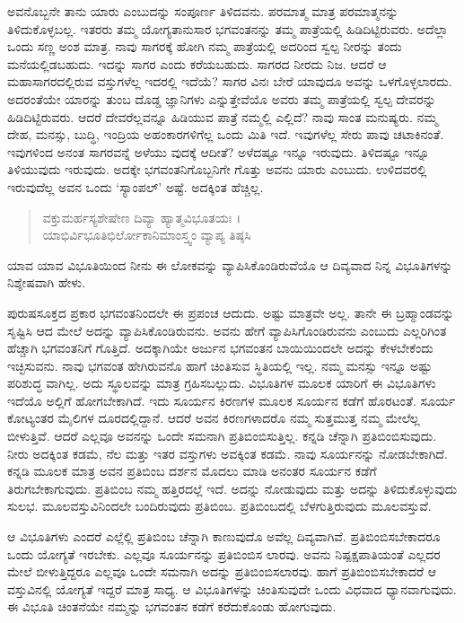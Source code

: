 ಅವನೊಬ್ಬನೇ ತಾನು ಯಾರು ಎಂಬುದನ್ನು ಸಂಪೂರ್ಣ ತಿಳಿದವನು. ಪರಮಾತ್ಮ ಮಾತ್ರ ಪರಮಾತ್ಮನನ್ನು ತಿಳಿದುಕೊಳ್ಳಬಲ್ಲ. ಇತರರು ತಮ್ಮ ಯೋಗ್ಯತಾನುಸಾರ ಭಗವಂತನನ್ನು ತಮ್ಮ ಪಾತ್ರೆಯಲ್ಲಿ ಹಿಡಿದಿಟ್ಟಿರುವರು. ಅದೆಲ್ಲಾ ಒಂದು ಸಣ್ಣ ಅಂಶ ಮಾತ್ರ. ನಾವು ಸಾಗರಕ್ಕೆ ಹೋಗಿ ನಮ್ಮ ಪಾತ್ರೆಯಲ್ಲಿ ಅದರಿಂದ ಸ್ವಲ್ಪ ನೀರನ್ನು ತಂದು ಮನೆಯಲ್ಲಿಡಬಹುದು. ಇದನ್ನು ಸಾಗರ ಎಂದು ಕರೆಯಬಹುದು. ಸಾಗರದ ನೀರದು ನಿಜ. ಆದರೆ ಆ ಮಹಾಸಾಗರದಲ್ಲಿರುವ ವಸ್ತುಗಳೆಲ್ಲ ಇದರಲ್ಲಿ ಇದೆಯೆ? ಸಾಗರ ವಿನಃ ಬೇರೆ ಯಾವುದೂ ಅವನ್ನು ಒಳಗೊಳ್ಳಲಾರದು. ಅದರಂತೆಯೇ ಯಾರನ್ನು ತುಂಬ ದೊಡ್ಡ ಜ್ಞಾನಿಗಳು ಎನ್ನುತ್ತೇವೆಯೊ ಅವರು ತಮ್ಮ ಪಾತ್ರೆಯಲ್ಲಿ ಸ್ವಲ್ಪ ದೇವರನ್ನು ಹಿಡಿದಿಟ್ಟಿರುವರು. ಆದರೆ ದೇವರೆಲ್ಲವನ್ನೂ ಹಿಡಿಯುವ ಪಾತ್ರೆ ನಮ್ಮಲ್ಲಿ ಎಲ್ಲಿದೆ? ನಾವು ಸಾಂತ ಮನುಷ್ಯರು. ನಮ್ಮ ದೇಹ, ಮನಸ್ಸು, ಬುದ್ಧಿ, ಇಂದ್ರಿಯ ಅಹಂಕಾರಗಳಿಗೆಲ್ಲ ಒಂದು ಮಿತಿ ಇದೆ. ಇವುಗಳೆಲ್ಲ ಸೇರು ಪಾವು ಚಟಾಕಿನಂತೆ. ಇವುಗಳಿಂದ ಅನಂತ ಸಾಗರವನ್ನೆ ಅಳೆಯು ವುದಕ್ಕೆ ಆದೀತೆ? ಅಳೆದಷ್ಟೂ ಇನ್ನೂ ಇರುವುದು. ತಿಳಿದಷ್ಟೂ ಇನ್ನೂ ತಿಳಿಯುವುದು ಇರುವುದು. ಅದಕ್ಕೇ ಭಗವಂತನಿಗೊಬ್ಬನಿಗೇ ಗೊತ್ತು ಅವನು ಯಾರು ಎಂಬುದು. ಉಳಿದವರಲ್ಲಿ ಇರುವುದೆಲ್ಲ ಅವನ ಒಂದು ‘ಸ್ಯಾಂಪಲ್​’ ಅಷ್ಟೆ. ಅದಕ್ಕಿಂತ ಹೆಚ್ಚಿಲ್ಲ.

\begin{verse}
ವಕ್ತುಮರ್ಹಸ್ಯಶೇಷೇಣ ದಿವ್ಯಾ ಹ್ಯಾತ್ಮವಿಭೂತಯಃ ।\\ಯಾಭಿರ್ವಿಭೂತಿಭಿರ್ಲೋಕಾನಿಮಾಂಸ್ತ್ವಂ ವ್ಯಾಪ್ಯ ತಿಷ್ಠಸಿ 
\end{verse}

{\small ಯಾವ ಯಾವ ವಿಭೂತಿಯಿಂದ ನೀನು ಈ ಲೋಕವನ್ನು ವ್ಯಾಪಿಸಿಕೊಂಡಿರುವೆಯೊ ಆ ದಿವ್ಯವಾದ ನಿನ್ನ ವಿಭೂತಿಗಳನ್ನು ನಿಶ್ಶೇಷವಾಗಿ ಹೇಳು.}

ಪುರುಷಸೂಕ್ತದ ಪ್ರಕಾರ ಭಗವಂತನಿಂದಲೇ ಈ ಪ್ರಪಂಚ ಆದುದು. ಅಷ್ಟು ಮಾತ್ರವೇ ಅಲ್ಲ. ತಾನೇ ಈ ಬ್ರಹ್ಮಾಂಡವನ್ನು ಸೃಷ್ಟಿಸಿ ಆದ ಮೇಲೆ ಅದನ್ನು ವ್ಯಾಪಿಸಿಕೊಂಡಿರುವನು. ಅವನು ಹೇಗೆ ವ್ಯಾಪಿಸಿಗೊಂಡಿರುವನು ಎಂಬುದು ಎಲ್ಲರಿಗಿಂತ ಹೆಚ್ಚಾಗಿ ಭಗವಂತನಿಗೆ ಗೊತ್ತಿದೆ. ಅದಕ್ಕಾಗಿಯೇ ಅರ್ಜುನ ಭಗವಂತನ ಬಾಯಿಯಿಂದಲೇ ಅದನ್ನು ಕೇಳಬೇಕೆಂದು ಇಚ್ಛಿಸುವನು. ನಾವು ಭಗವಂತ ಹೇಗಿರುವನೊ ಹಾಗೆ ಚಿಂತಿಸುವ ಸ್ಥಿತಿಯಲ್ಲಿ ಇಲ್ಲ. ನಮ್ಮ ಮನಸ್ಸು ಇನ್ನೂ ಅಷ್ಟು ಪರಿಶುದ್ಧ ವಾಗಿಲ್ಲ. ಅದು ಸ್ಥೂಲವನ್ನು ಮಾತ್ರ ಗ್ರಹಿಸಬಲ್ಲುದು. ವಿಭೂತಿಗಳ ಮೂಲಕ ಯಾರಿಗೆ ಈ ವಿಭೂತಿಗಳು ಇದೆಯೊ ಅಲ್ಲಿಗೆ ಹೋಗಬೇಕಾಗಿದೆ. ಇದು ಸೂರ್ಯನ ಕಿರಣಗಳ ಮೂಲಕ ಸೂರ್ಯನ ಕಡೆಗೆ ಹೊರಟಂತೆ. ಸೂರ್ಯ ಕೋಟ್ಯಂತರ ಮೈಲಿಗಳ ದೂರದಲ್ಲಿದ್ದಾನೆ. ಆದರೆ ಅವನ ಕಿರಣಗಳಾದರೊ ನಮ್ಮ ಸುತ್ತಮುತ್ತ ನಮ್ಮ ಮೇಲೆಲ್ಲ ಬೀಳುತ್ತಿವೆ. ಆದರೆ ಎಲ್ಲವೂ ಅವನನ್ನು ಒಂದೇ ಸಮನಾಗಿ ಪ್ರತಿಬಿಂಬಿಸುತ್ತಿಲ್ಲ. ಕನ್ನಡಿ ಚೆನ್ನಾಗಿ ಪ್ರತಿಬಿಂಬಿಸುವುದು. ನೀರು ಅದಕ್ಕಿಂತ ಕಡಮೆ, ನೆಲ ಮತ್ತು ಇತರ ವಸ್ತುಗಳು ಅವಕ್ಕಿಂತ ಕಡಮೆ. ನಾವು ಸೂರ್ಯನನ್ನು ನೋಡಬೇಕಾಗಿದೆ. ಕನ್ನಡಿ ಮೂಲಕ ಮಾತ್ರ ಅವನ ಪ್ರತಿಬಿಂಬ ದರ್ಶನ ಮೊದಲು ಮಾಡಿ ಅನಂತರ ಸೂರ್ಯನ ಕಡೆಗೆ ತಿರುಗಬೇಕಾಗುವುದು. ಪ್ರತಿಬಿಂಬ ನಮ್ಮ ಹತ್ತಿರದಲ್ಲೆ ಇದೆ. ಅದನ್ನು ನೋಡುವುದು ಮತ್ತು ಅದನ್ನು ತಿಳಿದುಕೊಳ್ಳುವುದು ಸುಲಭ. ಮೂಲವಸ್ತುವಿನಿಂದಲೇ ಬಂದಿರುವುದು ಪ್ರತಿಬಿಂಬ. ಪ್ರತಿಬಿಂಬದಲ್ಲಿ ಬೆಳಗುತ್ತಿರುವುದು ಮೂಲವಸ್ತುವೆ.

ಆ ವಿಭೂತಿಗಳು ಎಂದರೆ ಎಲ್ಲೆಲ್ಲಿ ಪ್ರತಿಬಿಂಬ ಚೆನ್ನಾಗಿ ಕಾಣುವುದೊ ಅವೆಲ್ಲ ದಿವ್ಯವಾಗಿವೆ. ಪ್ರತಿಬಿಂಬಿಸಬೇಕಾದರೂ ಒಂದು ಯೋಗ್ಯತೆ ಇರಬೇಕು. ಎಲ್ಲವೂ ಸೂರ್ಯನನ್ನು ಪ್ರತಿಬಿಂಬಿಸ ಲಾರವು. ಅವನು ನಿಷ್ಪಕ್ಷಪಾತಿಯಂತೆ ಎಲ್ಲದರ ಮೇಲೆ ಬೀಳುತ್ತಿದ್ದರೂ ಎಲ್ಲವೂ ಒಂದೇ ಸಮನಾಗಿ ಅದನ್ನು ಪ್ರತಿಬಿಂಬಿಸಲಾರವು. ಹಾಗೆ ಪ್ರತಿಬಿಂಬಿಸಬೇಕಾದರೆ ಆ ವಸ್ತುವಿನಲ್ಲಿ ಯೋಗ್ಯತೆ ಇದ್ದರೆ ಮಾತ್ರ ಸಾಧ್ಯ. ಆ ವಿಭೂತಿಗಳನ್ನು ಚಿಂತಿಸುವುದೇ ಒಂದು ವಿಧವಾದ ಧ್ಯಾನವಾಗುವುದು. ಈ ವಿಭೂತಿ ಚಿಂತನೆಯೇ ನಮ್ಮನ್ನು ಭಗವಂತನ ಕಡೆಗೆ ಕರೆದುಕೊಂಡು ಹೋಗುವುದು.

